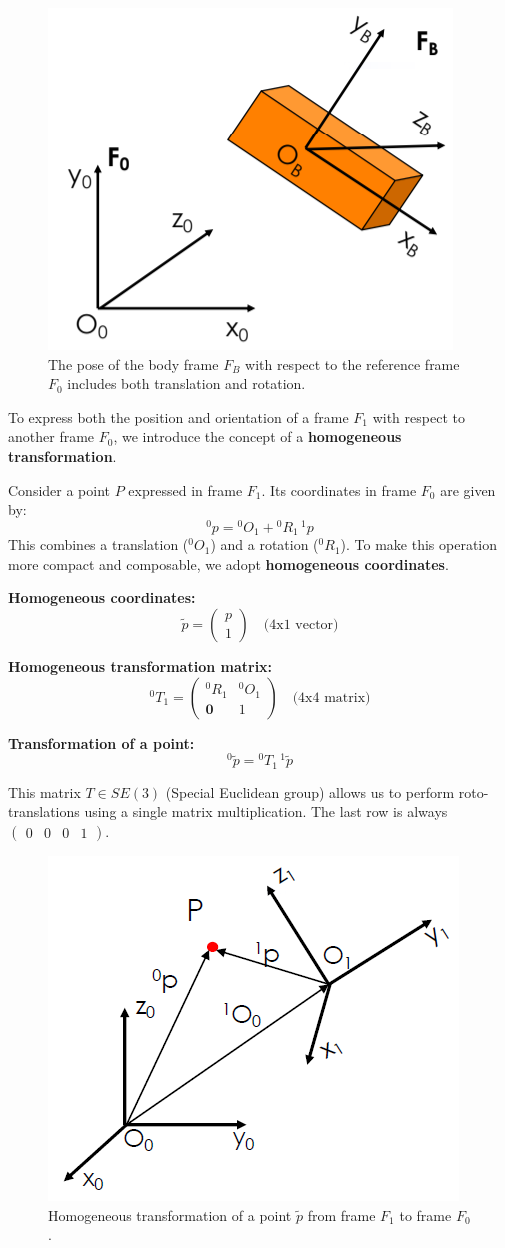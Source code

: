 \begin{figure}[H]
  \centering
  \includegraphics[width=0.4\linewidth]{imgs/homogeneous_transformations.png}
  \caption{The pose of the body frame $F_B$ with respect to the reference frame $F_0$ includes both translation and rotation.}
\end{figure}

To express both the position and orientation of a frame $F_1$ with respect to another frame $F_0$, we introduce the concept of a \textbf{homogeneous transformation}.

Consider a point $P$ expressed in frame $F_1$. Its coordinates in frame $F_0$ are given by:
\[
{}^0\!p = {}^0\!O_1 + {}^0\!R_1\, {}^1\!p
\]
This combines a translation (${ }^0\!O_1$) and a rotation (${ }^0\!R_1$). To make this operation more compact and composable, we adopt \textbf{homogeneous coordinates}.

\textbf{Homogeneous coordinates:}
\[
\tilde{p} = 
\begin{pmatrix}
p \\
1
\end{pmatrix}
\quad \text{(4x1 vector)}
\]

\textbf{Homogeneous transformation matrix:}
\[
{}^0\!T_1 =
\begin{pmatrix}
{}^0\!R_1 & {}^0\!O_1 \\
\mathbf{0} & 1
\end{pmatrix}
\quad \text{(4x4 matrix)}
\]

\textbf{Transformation of a point:}
\[
{}^0\!\tilde{p} = {}^0\!T_1\, {}^1\!\tilde{p}
\]

This matrix $T \in SE(3)$ (Special Euclidean group) allows us to perform roto-translations using a single matrix multiplication. The last row is always $\begin{pmatrix} 0 & 0 & 0 & 1 \end{pmatrix}$.

\begin{figure}[H]
  \centering
  \includegraphics[width=0.5\linewidth]{imgs/homogeneous_point_position.png}
  \caption{Homogeneous transformation of a point $\tilde{p}$ from frame $F_1$ to frame $F_0$.}
\end{figure}

